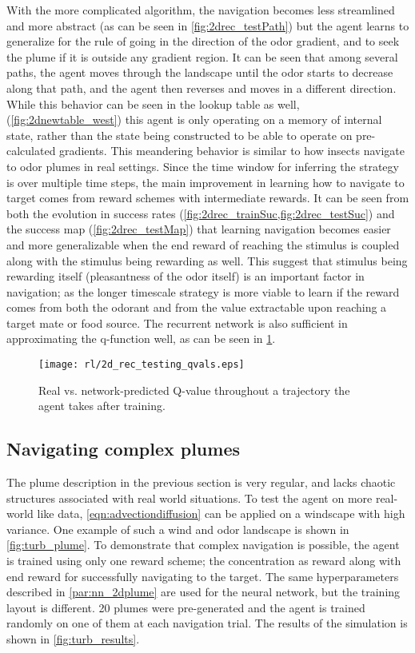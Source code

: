 \documentclass[../dissertation.tex]{subfiles}
\begin{document}
With the more complicated algorithm, the navigation becomes less streamlined and more abstract (as can be seen in \cref{fig:2drec_testPath}) but the agent learns to generalize for the rule of going in the direction of the odor gradient, and to seek the plume if it is outside any gradient region.
It can be seen that among several paths, the agent moves through the landscape until the odor starts to decrease along that path, and the agent then reverses and moves in a different direction.
While this behavior can be seen in the lookup table as well, (\cref{fig:2dnewtable_west}) this agent is only operating on a memory of internal state, rather than the state being constructed to be able to operate on pre-calculated gradients.  
This meandering behavior is similar to how insects navigate to odor plumes in real settings.
Since the time window for inferring the strategy is over multiple time steps, the main improvement in learning how to navigate to target comes from reward schemes with intermediate rewards.
It can be seen from both the evolution in success rates (\cref{fig:2drec_trainSuc,fig:2drec_testSuc}) and the success map (\cref{fig:2drec_testMap}) that learning navigation becomes easier and more generalizable when the end reward of reaching the stimulus is coupled along with the stimulus being rewarding as well.
This suggest that stimulus being rewarding itself (pleasantness of the odor itself) is an important factor in navigation; as the longer timescale strategy is more viable to learn if the reward comes from both the odorant and from the value extractable upon reaching a target mate or food source.
The recurrent network is also sufficient in approximating the q-function well, as can be seen in \cref{fig:2drec_qval}.

\begin{figure}[p]
    \centering
    \texttt{[image: rl/2d\_rec\_testing\_qvals.eps]}
    \caption{Real vs. network-predicted Q-value throughout a trajectory the agent takes after training.}
    \label{fig:2drec_qval}
\end{figure}

\subsection{Navigating complex plumes}

The plume description in the previous section is very regular, and lacks chaotic structures associated with real world situations.
To test the agent on more real-world like data, \cref{eqn:advectiondiffusion} can be applied on a windscape with high variance.
One example of such a wind and odor landscape is shown in \cref{fig:turb_plume}.
To demonstrate that complex navigation is possible, the agent is trained using only one reward scheme; the concentration as reward along with end reward for successfully navigating to the target.
The same hyperparameters described in \ref{par:nn_2dplume} are used for the neural network, but the training layout is different.
20 plumes were pre-generated and the agent is trained randomly on one of them at each navigation trial.
The results of the simulation is shown in \cref{fig:turb_results}.
\end{document}
